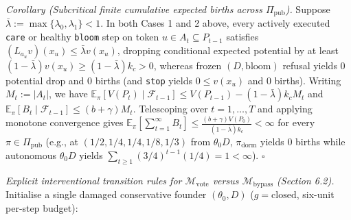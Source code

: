 \documentclass[12pt,letterpaper]{article}
\begin{document}
\emph{Corollary (Subcritical finite cumulative expected births across
\(\Pi_{\mathrm{pub}}\)).} Suppose
\(\bar{\lambda} := \max\{\lambda_0, \lambda_1\} < 1\). In both Cases 1
and 2 above, every actively executed \texttt{care} or healthy
\texttt{bloom} step on token \(u \in A_t \subseteq P_{t-1}\) satisfies
\((L_{a_u} v)(x_u) \le \bar{\lambda} v(x_u)\), dropping conditional
expected potential by at least
\((1 - \bar{\lambda})v(x_u) \ge (1 - \bar{\lambda})k_c > 0\), whereas
frozen \((D, \mathrm{bloom})\) refusal yields \(0\) potential drop and
\(0\) births (and \texttt{stop} yields \(0 \le v(x_u)\) and \(0\)
births). Writing \(M_t := |A_t|\), we have
\(\mathbb{E}_\pi[V(P_t) \mid \mathcal{F}_{t-1}] \le V(P_{t-1}) - (1 - \bar{\lambda})k_c M_t\)
and \(\mathbb{E}_\pi[B_t \mid \mathcal{F}_{t-1}] \le (b + \gamma)M_t\).
Telescoping over \(t = 1, \dots, T\) and applying monotone convergence
gives
\(\mathbb{E}_\pi[\sum_{t=1}^\infty B_t] \le \frac{(b+\gamma)V(P_0)}{(1-\bar{\lambda})k_c} < \infty\)
for every \(\pi \in \Pi_{\mathrm{pub}}\) (e.g., at
\((1/2, 1/4, 1/4, 1/8, 1/3)\) from \(\theta_0 D\),
\(\pi_{\mathrm{dorm}}\) yields \(0\) births while autonomous
\(\theta_0 D\) yields \(\sum_{t\ge 1} (3/4)^{t-1}(1/4) = 1 < \infty\)).
\(\square\)

\emph{Explicit interventional transition rules for
\(\mathcal{M}_{\mathrm{vote}}\) versus \(\mathcal{M}_{\mathrm{bypass}}\)
(Section 6.2).} Initialise a single damaged conservative founder
\((\theta_0, D)\) (\(g = \mathrm{closed}\), six-unit per-step budget):
\end{document}
